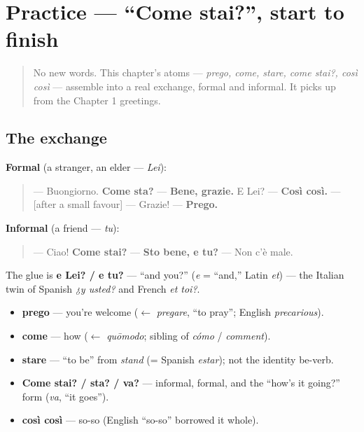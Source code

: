 \section[Practice]{Practice — \textquotedblleft{}Come stai?\textquotedblright{}, start to finish}

\label{lesson:IT-C02-practice}



\begin{quote}
No new words. This chapter's atoms — \emph{prego, come, stare, come stai?, così così} — assemble into a real exchange, formal and informal. It picks up from the Chapter 1 greetings.
\end{quote}

\subsection*{The exchange}
\textbf{Formal} (a stranger, an elder — \emph{Lei}):

\begin{quote}
— Buongiorno. \textbf{Come sta?} — \textbf{Bene, grazie.} E Lei? — \textbf{Così così.} — {[}after a small favour{]} — Grazie! — \textbf{Prego.}
\end{quote}

\textbf{Informal} (a friend — \emph{tu}):

\begin{quote}
— Ciao! \textbf{Come stai?} — \textbf{Sto bene, e tu?} — Non c'è male.
\end{quote}

The glue is \textbf{e Lei? / e tu?} — \textquotedblleft{}and you?\textquotedblright{} (\emph{e} = \textquotedblleft{}and,\textquotedblright{} Latin \emph{et}) — the Italian twin of Spanish \emph{¿y usted?} and French \emph{et toi?}.

\begin{grammarlens}[title={What you've built this chapter}]
\begin{itemize}
\raggedright
  \item \textbf{prego} — you're welcome ($\leftarrow$ \emph{pregare}, \textquotedblleft{}to pray\textquotedblright{}; English \emph{precarious}).
  \item \textbf{come} — how ($\leftarrow$ \emph{quōmodo}; sibling of \emph{cómo} / \emph{comment}).
  \item \textbf{stare} — \textquotedblleft{}to be\textquotedblright{} from \emph{stand} (= Spanish \emph{estar}); not the identity be-verb.
  \item \textbf{Come stai? / sta? / va?} — informal, formal, and the \textquotedblleft{}how's it going?\textquotedblright{} form (\emph{va}, \textquotedblleft{}it goes\textquotedblright{}).
  \item \textbf{così così} — so-so (English \textquotedblleft{}so-so\textquotedblright{} borrowed it whole).
\end{itemize}
\end{grammarlens}

